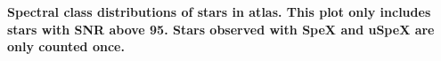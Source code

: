 {\bf  Spectral class distributions of stars in atlas. This plot only includes stars with SNR above 95.  Stars observed with SpeX and uSpeX are only counted once.\label{fig:hiso-spt-type}}


